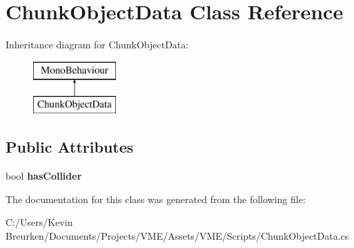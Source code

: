 \hypertarget{class_chunk_object_data}{}\section{Chunk\+Object\+Data Class Reference}
\label{class_chunk_object_data}
Inheritance diagram for Chunk\+Object\+Data\+:\begin{figure}[H]
\begin{center}
\leavevmode
\includegraphics[height=2.000000cm]{class_chunk_object_data}
\end{center}
\end{figure}
\subsection*{Public Attributes}
\begin{DoxyCompactItemize}
\item 
bool {\bfseries has\+Collider}\hypertarget{class_chunk_object_data_a8e898a50778de2f10b16ef1278d0503d}{}\label{class_chunk_object_data_a8e898a50778de2f10b16ef1278d0503d}

\end{DoxyCompactItemize}


The documentation for this class was generated from the following file\+:\begin{DoxyCompactItemize}
\item 
C\+:/\+Users/\+Kevin Breurken/\+Documents/\+Projects/\+V\+M\+E/\+Assets/\+V\+M\+E/\+Scripts/Chunk\+Object\+Data.\+cs\end{DoxyCompactItemize}
